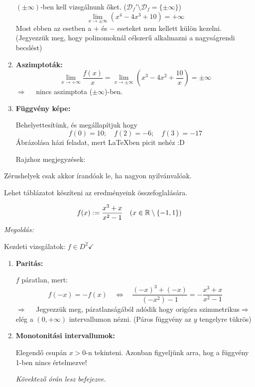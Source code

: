 \documentclass[a4paper,11.5pt]{article}
\begin{document}
\begin{task}
\begin{enumerate}
			$(\pm\infty)$-ben kell vizsgálnunk őket. ($\mathcal{D}_f'\setminus\mathcal{D}_f=\{\pm\infty\}$)
			\[ \lim_{x\to\pm\infty}(x^4-4x^3+10)=+\infty \]
			Most ebben az esetben a $+$ és $-$ eseteket nem kellett külön kezelni. (Jegyezzük meg, hogy polinomoknál célszerű alkalmazni a nagyságrendi becslést)
			\item \textbf{Aszimptoták:}
			\[ \lim_{x\to+\infty}\frac{f(x)}{x}=\lim_{x\to\pm\infty}\left(x^3-4x^2+\frac{10}{x}\right)=\pm\infty \]
			$\Rightarrow\quad $ nincs aszimptota ($\pm\infty$)-ben.
			\item \textbf{Függvény képe:}
			
			Behelyettesítünk, és megállapítjuk hogy
			\[ f(0)=10;\quad f(2)=-6;\quad f(3)=-17 \]
			Ábrázolása házi feladat, mert \LaTeX ben picit nehéz :D
			
			Rajzhoz megjegyzések:
		\end{enumerate}
	\end{task}
	\begin{note}
		Zérushelyek csak akkor írandóak le, ha nagyon nyilvánvalóak.
	\end{note}
	\begin{note}
		Lehet táblázatot készíteni az eredményeink összefoglalására.
	\end{note}
	\begin{task}
		\[ f(x):=\frac{x^3+x}{x^2-1}\quad (x\in\mathbb{R}\setminus\{-1,1\}) \]
		\textit{Megoldás:}
		
		Kezdeti vizsgálatok: $f\in D^2\checkmark$
		\begin{enumerate}
			\item \textbf{Paritás:}
			
			$f$ páratlan, mert:
			\[ f(-x)=-f(x)\quad \Leftrightarrow\quad \frac{(-x)^3+(-x)}{(-x^2)-1}=-\frac{x^3+x}{x^2-1} \]
			$\Rightarrow\quad $ Jegyezzük meg, páratlanságából adódik hogy origóra szimmetrikus\quad $\Rightarrow$\quad elég a $(0,+\infty)$ intervallumon nézni. (Páros függvény az $y$ tengelyre tükrös)
			\item \textbf{Monotonitási intervallumok:}
			
			Elegendő csupán $x>0$-n tekinteni. Azonban figyeljünk arra, hog a függvény 1-ben nincs értelmezve!
			
			\textit{Kövektező órán lesz befejezve.}
		\end{enumerate}
	\end{task}
	
\end{document}
